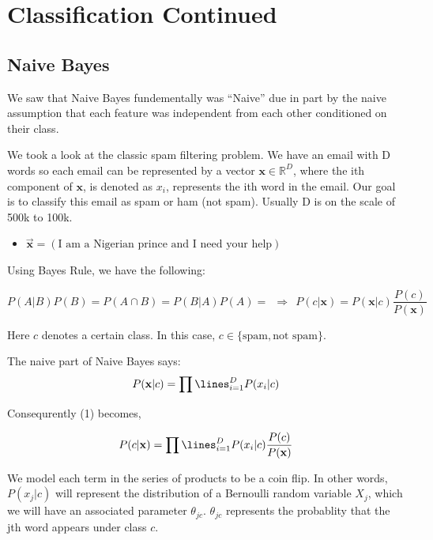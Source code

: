 
\section{Classification Continued}
\subsection{Naive Bayes}

We saw that Naive Bayes fundementally was ``Naive'' due in part by the naive assumption that each feature was independent from each other conditioned on their class.  

We took a look at the classic spam filtering problem.  We have an email with D words so each email can be represented by a vector $\mathbf{x} \in \mathbb{R}^D$, where the ith component of $\mathbf{x}$, is denoted as $x_i$, represents the ith word in the email.  Our goal is to classify this email as spam or ham (not spam).  Usually D is on the scale of 500k to 100k.  

\begin{itemize}
\item 
 $\vec{\mathbf{x}} = ( \text{I am a Nigerian prince and I need your help} ) $
\end{itemize}

Using Bayes Rule, we have the following: 

\begin{equation}
P(A | B ) P(B) = P(A \cap B) = P(B | A ) P(A) = ~~ \Rightarrow ~~ P(c | \mathbf{x}) = P(\mathbf{x} | c ) \frac{P(c)}{P(\mathbf{x})}
\end{equation}

Here $c$ denotes a certain class.  In this case, $c \in \{ \text{spam}, \text{not spam} \}$.   

\indent 

The naive part of Naive Bayes says: 
$$
P(\mathbf{x} | c ) = \prod\lines_{i=1}^D P(x_i | c) 
$$

Consequrently (1) becomes, 

\begin{equation}
P(c | \mathbf{x}) = \prod\lines_{i=1}^D P(x_i | c)  \frac{P(c)}{P(\mathbf{x})}
\end{equation}

We model each term in the series of products to be a coin flip.  In other words, $P(x_j | c)$ will represent the distribution of a Bernoulli random variable $X_j$, which we will have an associated parameter $\theta_{jc}$. $\theta_{jc}$ represents the probablity that the jth word appears under class $c$. 

